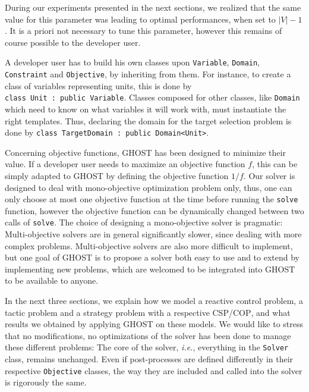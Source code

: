 \documentclass[journal]{IEEEtran}
\newcommand{\csp}{\textsc{CSP}\xspace}
\newcommand{\cop}{\textsc{COP}\xspace}
\newcommand{\ghost}{\textsc{GHOST}\xspace}
\newcommand{\ie}{\textit{i.e.}}
\begin{document}
During our  experiments presented  in the  next sections,  we realized
that  the  same  value  for  this parameter  was  leading  to  optimal
performances, when  set to $|V|-1$.  It  is a priori not  necessary to
tune this  parameter, however this  remains of course possible  to the
developer user.

A developer user has to  build his own classes upon \texttt{Variable},
\texttt{Domain},   \texttt{Constraint}   and  \texttt{Objective},   by
inheriting from  them. For  instance, to create  a class  of variables
representing        units,        this        is        done        by
\texttt{class~Unit~:~public~Variable}.   Classes  composed  for  other
classes, like \texttt{Domain} which need  to know on what variables it
will work with, must instantiate  the right templates. Thus, declaring
the   domain   for  the   target   selection   problem  is   done   by
\texttt{class~TargetDomain~:~public~Domain<Unit>}.

Concerning objective  functions, \ghost has been  designed to minimize
their  value.  If  a developer  user  needs to  maximize an  objective
function $f$,  this can be  simply adapted  to \ghost by  defining the
objective  function  $1/f$.   Our  solver is  designed  to  deal  with
mono-objective optimization problem only, thus, one can only choose at
most  one   objective  function  at   the  time  before   running  the
\texttt{solve}  function,  however  the   objective  function  can  be
dynamically changed between two calls of \texttt{solve}. The choice of
designing  a  mono-objective   solver  is  pragmatic:  Multi-objective
solvers are in  general significantly slower, since  dealing with more
complex problems.  Multi-objective solvers  are also more difficult to
implement, but one goal of \ghost is  to propose a solver both easy to
use and to extend by implementing  new problems, which are welcomed to
be integrated into \ghost to be available to anyone.

In the next three sections, we explain how we model a reactive control
problem, a  tactic problem  and a strategy  problem with  a respective
\csp/\cop, and  what results we  obtained by applying \ghost  on these
models.   We   would  like  to   stress  that  no   modifications,  no
optimizations of  the solver has  been done to manage  these different
problems:   The  core   of  the   solver,  \ie,   everything  in   the
\texttt{Solver} class, remains unchanged.   Even if post-processes are
defined  differently in  their respective  \texttt{Objective} classes,
the way they are included and called into the solver is rigorously the
same.
\end{document}
